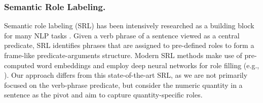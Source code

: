 \subsubsection{Semantic Role Labeling.} Semantic role labeling (SRL) has been intensively researched
as a building block for many 
NLP tasks \cite{DBLP:journals/coling/GildeaJ02}.
Given a verb phrase of a sentence
viewed as a central predicate, 
SRL identifies phrases that are assigned to
pre-defined roles to form a frame-like
predicate-arguments structure.
%
Modern SRL methods make use of pre-computed
word embeddings and employ deep neural networks
for role filling (e.g., \cite{DBLP:conf/acl/ZhouX15, DBLP:conf/acl/HeLLZ17a, DBLP:conf/emnlp/FitzGeraldTG015}).
%
Our approach differs from this state-of-the-art SRL,
as we are not primarily focused on the verb-phrase
predicate, but consider the numeric quantity in a sentence
as the pivot and aim to capture quantity-specific roles.

